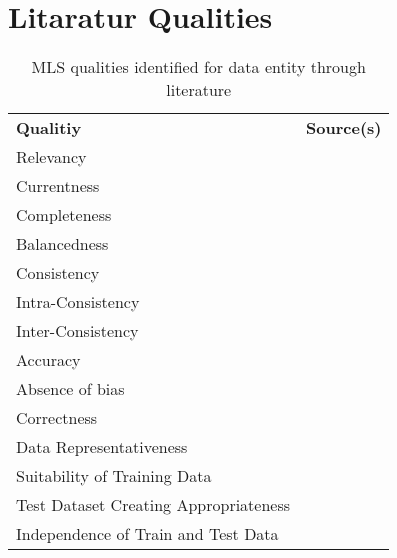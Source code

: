 %



\appendix
\chapter{Litaratur Qualities}

\begin{table}[h]\label{tb:LiteratureQualitiesData}
    \centering
    \begin{tabular}{p{} p{}}
        \textbf{Qualitiy} & \textbf{Source(s)} \\
        Relevancy &~\cite{ashmore_assuring_2021} \\
        Currentness &~\cite{siebert_construction_2021} \\
        Completeness &~\cite{ashmore_assuring_2021, vogelsang_requirements_2019,
                            siebert_construction_2021} \\
        Balancedness &~\cite{ashmore_assuring_2021,siebert_construction_2021} \\
        Consistency &~\cite{vogelsang_requirements_2019} \\
        Intra-Consistency &~\cite{siebert_construction_2021} \\
        Inter-Consistency &~\cite{siebert_construction_2021} \\
        Accuracy &~\cite{ashmore_assuring_2021} \\
        Absence of bias &~\cite{siebert_construction_2021} \\
        Correctness &~\cite{vogelsang_requirements_2019} \\
        Data Representativeness &~\cite{nakamichi_requirements-driven_2020, siebert_construction_2021} \\
        Suitability of Training Data &~\cite{nakamichi_requirements-driven_2020} \\
        Test Dataset Creating Appropriateness &~\cite{nakamichi_requirements-driven_2020} \\
        Independence of Train and Test Data &~\cite{nakamichi_requirements-driven_2020,
                                                    siebert_construction_2021} \\
    \end{tabular}
    \caption{\ac{MLS} qualities identified for data entity through literature}
\end{table}

